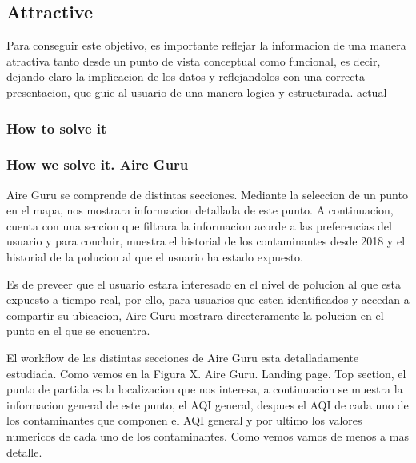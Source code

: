 \subsection{Attractive}
Para conseguir este objetivo, es importante reflejar la informacion de una manera atractiva tanto desde un punto de vista conceptual como funcional, 
es decir, dejando claro la implicacion de los datos y reflejandolos con una correcta presentacion, que guie al usuario de una manera logica y estructurada.
actual
\subsubsection{How to solve it} 


\subsubsection{How we solve it. Aire Guru} 
Aire Guru se comprende de distintas secciones. Mediante la seleccion de un punto en el mapa, nos
mostrara informacion detallada de este punto. A continuacion, cuenta con una seccion que filtrara la informacion acorde a las preferencias del usuario
y para concluir, muestra el historial de los contaminantes desde 2018 y el historial de la polucion al que el usuario ha estado
expuesto.

Es de preveer que el usuario estara interesado en el nivel de polucion al que esta expuesto a tiempo real, por ello, para usuarios
que esten identificados y accedan a compartir su ubicacion, Aire Guru mostrara directeramente la polucion en el punto en el 
que se encuentra.

El workflow de las distintas secciones de Aire Guru esta detalladamente estudiada. Como vemos en la Figura X. Aire Guru. Landing page. Top section, el punto de partida es la localizacion que nos interesa,
a continuacion se muestra la informacion general de este punto, el AQI general, despues el AQI de cada uno de los contaminantes que componen el 
AQI general y por ultimo los valores numericos de cada uno de los contaminantes. Como vemos vamos de menos a mas detalle.
\begin{itemize}
    \done
    \crossed
    
\end{itemize}
\newpage